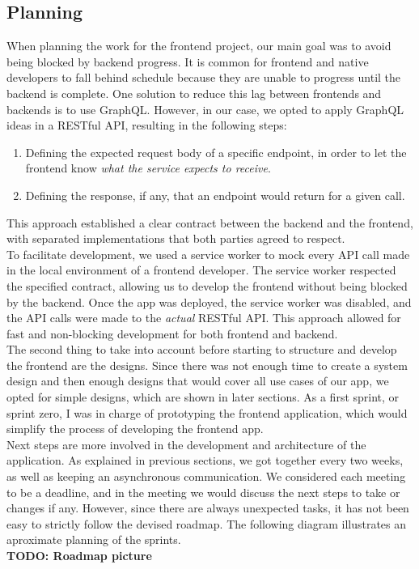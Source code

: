 \documentclass[../memory.tex]{subfiles}
\begin{document}
\subsection{Planning}
When planning the work for the frontend project, our main goal was to avoid
being blocked by backend progress. It is common for frontend and native
developers to fall behind schedule because they are unable to progress until the
backend is complete. One solution to reduce this lag between frontends and
backends is to use GraphQL. However, in our case, we opted to apply GraphQL
ideas in a RESTful API, resulting in the following steps:
\begin{enumerate}[label = -]
  \item Defining the expected request body of a specific endpoint, in order to
    let the frontend know \emph{what the service expects to receive}.
  \item Defining the response, if any, that an endpoint would return for a given call.
\end{enumerate}
This approach established a clear contract between the backend and the frontend,
with separated implementations that both parties agreed to respect.
\\
To facilitate development, we used a service worker to mock every API call made
in the local environment of a frontend developer. The service worker respected
the specified contract, allowing us to develop the frontend without being
blocked by the backend. Once the app was deployed, the service worker was
disabled, and the API calls were made to the \emph{actual} RESTful API. This
approach allowed for fast and non-blocking development for both frontend and
backend.
\\[8pt]
The second thing to take into account before starting to structure and develop
the frontend are the designs. Since there was not enough time to create a system
design and then enough designs that would cover all use cases of our app, we
opted for simple designs, which are shown in later sections. As a first sprint,
or sprint zero, I was in charge of prototyping the frontend application, which
would simplify the process of developing the frontend app.
\\[8pt]
Next steps are more involved in the development and architecture of the
application. As explained in previous sections, we got together every two weeks,
as well as keeping an asynchronous communication. We considered each meeting to
be a deadline, and in the meeting we would discuss the next steps to take or
changes if any. However, since there are always unexpected tasks, it has not
been easy to strictly follow the devised roadmap. The following diagram
illustrates an aproximate planning of the sprints.
\\
\textbf{TODO: Roadmap picture}
\end{document}
